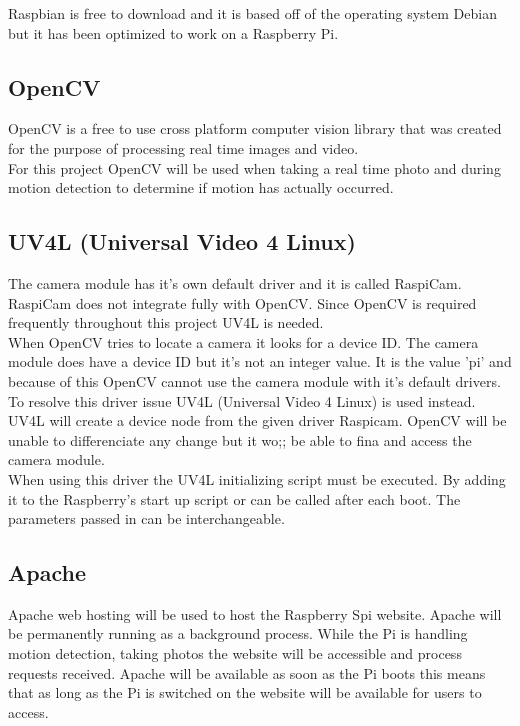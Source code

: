 \documentclass[12pt]{report}
\begin{document}
Raspbian is free to download and it is based off of the operating system Debian but it has been optimized to work on a Raspberry Pi. \\ 

\noindent
\subsection{OpenCV}
\label{subsec:OpenCV}
\break

OpenCV is a free to use cross platform computer vision library that was created for the purpose of processing real time images and video.\\

For this project OpenCV will be used when taking a real time photo and during motion detection to determine if motion has actually occurred.\\

\noindent
\subsection{UV4L (Universal Video 4 Linux)}
\label{subsec:UV4L}
The camera module has it's own default driver and it is called RaspiCam. RaspiCam does not integrate fully with OpenCV. Since OpenCV is required frequently throughout this project UV4L is needed.\\

When OpenCV tries to locate a camera it looks for a device ID. The camera module does have a device ID but it's not an integer value. It is the value 'pi' and because of this OpenCV cannot use the camera module with it's default drivers. To resolve this driver issue UV4L (Universal Video 4 Linux) is used instead. UV4L will create a device node from the given driver Raspicam. OpenCV will be unable to differenciate any change but it wo;; be able to fina and access the camera module.\\

When using this driver the UV4L initializing script must be executed. By adding it to the Raspberry's start up script or can be called after each boot. The parameters passed in can be interchangeable. \\


\noindent
\subsection{Apache}
\label{subsec:Apache}
Apache web hosting will be used to host the Raspberry Spi website. Apache will be permanently running as a background process. While the Pi is handling motion detection, taking photos the website will be accessible and process requests received. Apache will be available as soon as the Pi boots this means that as long as the Pi is switched on the website will be available for users to access.\\ 
\end{document}
